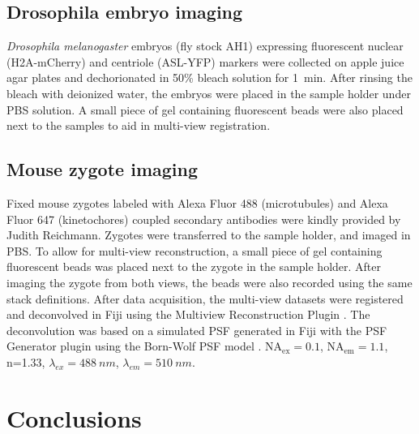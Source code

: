   \subsection{Drosophila embryo imaging}
    \textit{Drosophila melanogaster} embryos (fly stock AH1) expressing fluorescent nuclear (H2A-mCherry) and centriole (ASL-YFP) markers were collected on apple juice agar plates and dechorionated in 50\% bleach solution for \SI{1}{min}. After rinsing the bleach with deionized water, the embryos were placed in the sample holder under PBS solution. A small piece of gel containing fluorescent beads were also placed next to the samples to aid in multi-view registration.

  \subsection{Mouse zygote imaging}
    Fixed mouse zygotes labeled with Alexa Fluor 488 (microtubules) and Alexa Fluor 647 (kinetochores) coupled secondary antibodies were kindly provided by Judith Reichmann. Zygotes were transferred to the sample holder, and imaged in PBS. To allow for multi-view reconstruction, a small piece of gel containing fluorescent beads was placed next to the zygote in the sample holder. After imaging the zygote from both views, the beads were also recorded using the same stack definitions. After data acquisition, the multi-view datasets were registered and deconvolved in Fiji \cite{schindelin_fiji:_2012} using the Multiview Reconstruction Plugin \cite{preibisch_software_2010,preibisch_efficient_2014}. The deconvolution was based on a simulated PSF generated in Fiji with the PSF Generator plugin \cite{kirshner_3d_2011} using the Born-Wolf PSF model \cite{born_principles_2013}. $\mathrm{NA_{ex}}=0.1$, $\mathrm{NA_{em}}=1.1$, n=1.33, $\lambda_{ex} = \SI{488}{nm}$, $\lambda_{em} = \SI{510}{nm}$.

  



\section{Conclusions}

